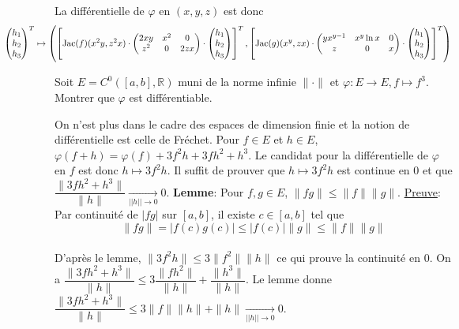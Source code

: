 \documentclass{fancybook}
\begin{document}
La différentielle de $\varphi$ en $(x,y,z)$ est donc 
$$\hspace{-2cm} \begin{pmatrix}
h_1 \\
h_2 \\
h_3
\end{pmatrix}^T \mapsto \left( \left[\operatorname{Jac}(f)(x^2y,z^2x) \cdot  \begin{pmatrix}
2xy & x^2 & 0 \\
z^2 & 0 & 2zx
\end{pmatrix}\cdot \begin{pmatrix}
h_1 \\
h_2 \\
h_3
\end{pmatrix}\right]^T, \left[\operatorname{Jac}(g)(x^y,zx) \cdot \begin{pmatrix}
yx^{y-1} & x^y\ln x & 0 \\
z & 0 & x
\end{pmatrix}\cdot \begin{pmatrix}
h_1 \\
h_2 \\
h_3
\end{pmatrix}\right]^T \right)$$

\begin{exercice}
Soit $E=C^0([a,b],\mathbb R)$ muni de la norme infinie $\|\cdot\|$ et $\varphi: E\to E, f \mapsto f^3$.\newline
Montrer que $\varphi$ est différentiable.
\end{exercice}
On n'est plus dans le cadre des espaces de dimension finie et la notion de différentielle est celle de Fréchet.\newline
Pour $f\in E$ et $h\in E$, $\varphi(f+h) = \varphi(f) + 3f^2h + 3fh^2+h^3$.\newline
Le candidat pour la différentielle de $\varphi$ en $f$ est donc $h\mapsto 3f^2h $. \newline
Il suffit de prouver que $h\mapsto 3f^2h $ est continue en $0$ et que  $\dfrac{\| 3fh^2+h^3\|}{\|h \|} \xrightarrow[||h||\to 0]{}0$.\newline
\textbf{Lemme}: Pour $f,g\in E$, $\|fg\| \leq \|f\| \|g\|$.\newline
\underline{Preuve}: Par continuité de $|fg|$ sur $[a,b]$, il existe $c\in [a,b]$ tel que $$\|fg\| = |f(c)g(c)|\leq |f(c)| \|g\| \leq \|f\| \|g\|$$\\
D'après le lemme, $\|3f^2h \|\leq 3\|f^2\|\|h\|$ ce qui prouve la continuité en $0$.\newline
On a $\dfrac{\| 3fh^2+h^3\|}{\|h \|}\leq 3 \dfrac{\| f h^2\|}{\|h \|} + \dfrac{\|h^3 \|}{\|h \|}$.\newline
Le lemme donne $\dfrac{\| 3fh^2+h^3\|}{\|h \|}\leq 3\|f\| \|h\| + \|h\|\xrightarrow[||h||\to 0]{}0$.
\end{document}
